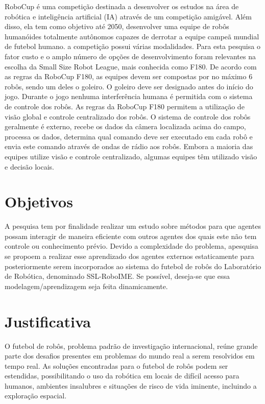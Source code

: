 RoboCup é uma competição destinada a desenvolver os estudos na área de robótica e
inteligência artificial (IA) através de um competição amigável. Além disso, ela tem
como objetivo até 2050, desenvolver uma equipe de robôs humanóides totalmente 
autônomos capazes de derrotar a equipe campeã mundial de futebol humano. a competição
possui várias modalidades. Para esta pesquisa o fator custo e o amplo número de opções
de desenvolvimento foram relevantes na escolha da Small Size Robot League, mais 
conhecida como F180. De acordo com as regras da RoboCup F180, as equipes devem ser
compostas por no máximo 6 robôs, sendo um deles o goleiro. O goleiro deve ser 
designado antes do início do jogo. Durante o jogo nenhuma interferência humana é
permitida com o sistema de controle dos robôs. As regras da RoboCup F180 permitem a
utilização de visão global e controle centralizado dos robôs. O sistema de controle
dos robôs geralmente é externo, recebe os dados da câmera localizada acima do campo,
processa os dados, determina qual comando deve ser executado em cada robô e envia este
comando através de ondas de rádio aos robôs. Embora a maioria das equipes utilize
visão e controle centralizado, algumas equipes têm utilizado visão e decisão locais.

\section{Objetivos}

A pesquisa tem por finalidade realizar um estudo sobre métodos para que agentes possam
interagir de maneira eficiente com outros agentes dos quais este não tem controle ou
conhecimento prévio. Devido a complexidade do problema, apesquisa se propoem a 
realizar esse aprendizado dos agentes externos estaticamente para posteriormente serem
incorporados ao sistema do futebol de robôs do Laboratório de Robótica, denominado
SSL-RoboIME. Se possível, deseja-se que essa modelagem/aprendizagem seja feita
dinamicamente.

\section{Justificativa}

O futebol de robôs, problema padrão de investigação internacional, reúne grande parte
dos desafios presentes em problemas do mundo real a serem resolvidos em tempo real.
As soluções encontradas para o futebol de robôs podem ser estendidas, possibilitando
o uso da robótica em locais de difícil acesso para humanos, ambientes insalubres e 
situações de risco de vida iminente, incluindo a exploração espacial.

